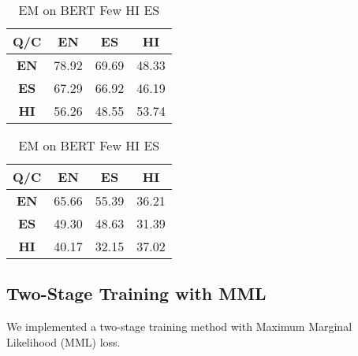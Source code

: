 \documentclass[12pt]{article}   %
\begin{document}
 \begin{table}[H]
        \begin{minipage}{0.5\textwidth}
            \centering
		\begin{tabular}{|c|c|c|c|}
			\hline
 			\textbf{Q/C} &  \textbf{EN} &  \textbf{ES} &  \textbf{HI} \\
			\hline
			 \textbf{EN} & 78.92 & 69.69 & 48.33 \\
			\hline
			\textbf{ES} & 67.29 &  66.92 & 46.19 \\
			\hline
			\textbf{HI} & 56.26 & 48.55 & 53.74 \\
			\hline
		\end{tabular}
		\caption{F1 on BERT Few HI ES}
	\end{minipage}%
        \hfill
	\begin{minipage}{0.5\textwidth}
         	\centering
			\begin{tabular}{|c|c|c|c|}
				\hline
				 \textbf{Q/C} &  \textbf{EN} &  \textbf{ES} &  \textbf{HI} \\
				\hline
				\textbf{EN} & 65.66 & 55.39 & 36.21 \\
				 \hline
				\textbf{ES} & 49.30 & 48.63 & 31.39 \\
				\hline
				 \textbf{HI} & 40.17 & 32.15 & 37.02\\
				 \hline
			\end{tabular}
			\caption{EM on BERT Few HI ES}
	\end{minipage}%
\end{table}

\subsection{Two-Stage Training with MML}
We implemented a two-stage training method with Maximum Marginal Likelihood (MML) loss.
\end{document}
